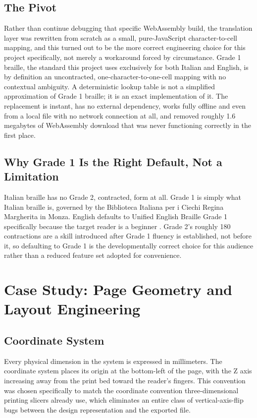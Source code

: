 \documentclass[conference]{IEEEtran}
\begin{document}
\subsection{The Pivot}

Rather than continue debugging that specific WebAssembly build, the translation layer was rewritten from scratch as a small, pure-JavaScript character-to-cell mapping, and this turned out to be the more correct engineering choice for this project specifically, not merely a workaround forced by circumstance. Grade 1 braille, the standard this project uses exclusively for both Italian and English, is by definition an uncontracted, one-character-to-one-cell mapping with no contextual ambiguity. A deterministic lookup table is not a simplified approximation of Grade 1 braille; it is an exact implementation of it. The replacement is instant, has no external dependency, works fully offline and even from a local file with no network connection at all, and removed roughly 1.6 megabytes of WebAssembly download that was never functioning correctly in the first place.

\subsection{Why Grade 1 Is the Right Default, Not a Limitation}

Italian braille has no Grade 2, contracted, form at all. Grade 1 is simply what Italian braille is, governed by the Biblioteca Italiana per i Ciechi Regina Margherita in Monza. English defaults to Unified English Braille Grade 1 specifically because the target reader is a beginner \cite{ueb}. Grade 2's roughly 180 contractions are a skill introduced after Grade 1 fluency is established, not before it, so defaulting to Grade 1 is the developmentally correct choice for this audience rather than a reduced feature set adopted for convenience.

\section{Case Study: Page Geometry and Layout Engineering}\label{sec:layout}

\subsection{Coordinate System}

Every physical dimension in the system is expressed in millimeters. The coordinate system places its origin at the bottom-left of the page, with the Z axis increasing away from the print bed toward the reader's fingers. This convention was chosen specifically to match the coordinate convention three-dimensional printing slicers already use, which eliminates an entire class of vertical-axis-flip bugs between the design representation and the exported file.
\end{document}
